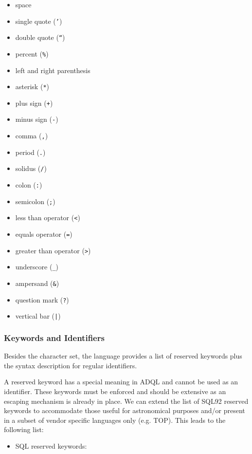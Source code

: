 \documentclass[11pt,a4paper]{ivoa}
\begin{document}
\begin{itemize}
\item space
\item single quote (\verb:’:)
\item double quote (\verb:“:)
\item percent (\verb:%:)
\item left and right parenthesis
\item asterisk (\verb:*:)
\item plus sign (\verb:+:)
\item minus sign (\verb:-:)
\item comma (\verb:,:)
\item period (\verb:.:)
\item solidus (\verb:/:)
\item colon (\verb.:.)
\item semicolon (\verb:;:)
\item less than operator (\verb:<:)
\item equals operator (\verb:=:)
\item greater than operator (\verb:>:)
\item underscore (\verb:_:)
\item ampersand (\verb:&:)
\item question mark (\verb:?:)
\item vertical bar (\verb:|:)
\end{itemize}

\subsubsection{Keywords and Identifiers}

Besides the character set, the language provides a list of reserved keywords
plus the syntax description for regular identifiers.

A reserved keyword has a special meaning in ADQL and cannot be used as
an identifier. These keywords must be enforced and should be extensive as
an escaping mechanism is already in place. We can extend the list of SQL92
reserved keywords to accommodate those useful for astronomical purposes and/or
present in a subset of vendor specific languages only (e.g. TOP). This leads
to the following list:

\begin{itemize}
\item SQL reserved keywords:
\end{itemize}
\end{document}
